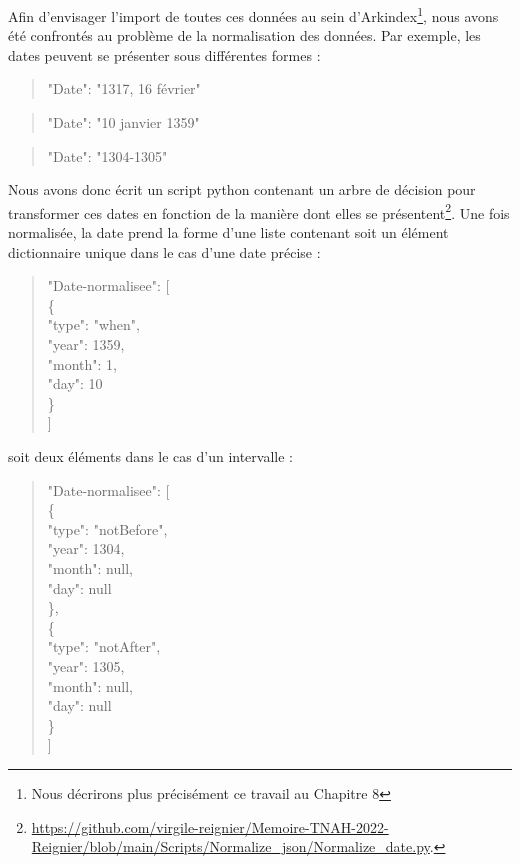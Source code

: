 \documentclass[a4paper,12pt,twoside]{book}
\begin{document}
	Afin d'envisager l'import de toutes ces données au sein d'Arkindex\footnote{Nous décrirons plus précisément ce travail au Chapitre 8}, nous avons été confrontés au problème de la normalisation des données. Par exemple, les dates peuvent se présenter sous différentes formes :
	
	\begin{quotation}
		"Date": "1317, 16 février"
	\end{quotation}
	
	\begin{quotation}
		"Date": "10 janvier 1359"
	\end{quotation}

	\begin{quotation}
		"Date": "1304-1305"
	\end{quotation}
	
	\noindent Nous avons donc écrit un script python contenant un arbre de décision pour transformer ces dates en fonction de la manière dont elles se présentent\footnote{	\url{https://github.com/virgile-reignier/Memoire-TNAH-2022-Reignier/blob/main/Scripts/Normalize_json/Normalize_date.py}.}. Une fois normalisée, la date prend la forme d'une liste contenant soit un élément dictionnaire unique dans le cas d'une date précise :

	\begin{quotation}
		"Date-normalisee": [\\
		\indent\indent\{\\
		\indent\indent	"type": "when",\\
		\indent\indent	"year": 1359,\\
		\indent\indent	"month": 1,\\
		\indent\indent	"day": 10\\
		\indent\indent\}\\
		\indent ]\\
	\end{quotation}

	\pagebreak
	
	\noindent soit deux éléments dans le cas d'un intervalle :
	
	\begin{quotation}
				"Date-normalisee": [\\
				\indent\indent		\{ \\
				\indent\indent		"type": "notBefore",\\
				\indent\indent		"year": 1304,\\
				\indent\indent		"month": null,\\
				\indent\indent		"day": null\\
				\indent\indent	\},\\
				\indent\indent	\{\\
				\indent\indent		"type": "notAfter",\\
				\indent\indent		"year": 1305,\\
				\indent\indent		"month": null,\\
				\indent\indent		"day": null\\
				\indent\indent	\}\\
				\indent	]\\
	\end{quotation}
	
\end{document}
